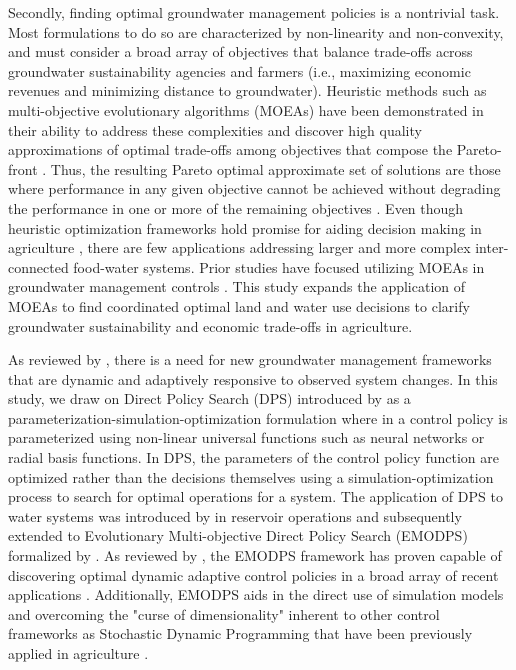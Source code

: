 \documentclass[a4paper,fleqn]{cas-sc}
\begin{document}
Secondly, finding optimal groundwater management policies is a nontrivial task. Most formulations to do so are characterized by non-linearity and non-convexity, and must consider a broad array of objectives that balance trade-offs across groundwater sustainability agencies and farmers (i.e., maximizing economic revenues and minimizing distance to groundwater). Heuristic methods such as  multi-objective evolutionary algorithms (MOEAs) have been demonstrated in their ability to address these complexities and discover high quality approximations of optimal trade-offs among objectives that compose the Pareto-front \citep{reed_evolutionary_2013}. Thus, the resulting Pareto optimal approximate set of solutions are those where performance in any given objective cannot be achieved without degrading the performance in one or more of the remaining objectives \citep{coello_evolutionary_2007}. Even though heuristic optimization frameworks hold promise for aiding decision making in agriculture \citep{memmah_metaheuristics_2015}, there are few applications addressing larger and more complex inter-connected food-water systems. Prior studies have focused utilizing MOEAs in groundwater management controls \citep{afshar_multi-objective_2020,salehi_shafa_multi-objective_2023,habibi_davijani_optimization_2016,mehrabi_assessment_2021,banihabib_development_2019,hesamfar_simulation-based_2023}. This study expands the application of MOEAs to find coordinated optimal land and water use decisions to clarify groundwater sustainability and economic trade-offs in agriculture.  

As reviewed by \citet{thomann_adaptive_2020}, there is a need for new groundwater management frameworks that are dynamic and adaptively responsive to observed system changes. In this study, we draw on Direct Policy Search (DPS) introduced by \citet{rosenstein_robot_2001} as a parameterization-simulation-optimization formulation where in a control policy is parameterized using non-linear universal functions such as neural networks or radial basis functions. In DPS, the parameters of the control policy function are optimized rather than the decisions themselves using a simulation-optimization process to search for optimal operations for a system. The application of DPS to water systems was introduced by \citet{koutsoyiannis_evaluation_2003} in reservoir operations and subsequently extended to Evolutionary Multi-objective Direct Policy Search (EMODPS) formalized by \citet{giuliani_universal_2014}. As reviewed by \citet{giuliani_state---art_2021}, the EMODPS framework has proven capable of discovering optimal dynamic adaptive control policies in a broad array of recent applications \citep{macian-sorribes_inferring_2019,gupta_can_2020,doering_diagnosing_2021,hamilton_stream_2022}. Additionally, EMODPS aids in the direct use of simulation models and overcoming the "curse of dimensionality" inherent to other control frameworks as Stochastic Dynamic Programming that have been previously applied in agriculture \citep{taylor_dynamic_1993}. 
\end{document}
